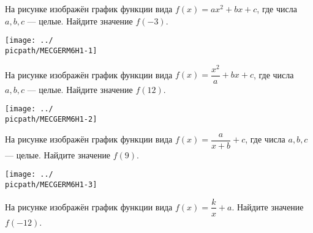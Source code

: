 %

\begin{class}[number=1]
	\begin{listofex}
		\item 
	\end{listofex}
\end{class}

\begin{homework}[number=1]
	\begin{listofex}
		\item 
		\begin{minipage}[t]{\bodywidth}
			На рисунке изображён график функции вида \( f(x)=ax^2+bx+c \), где числа \( a, b, c \) --- целые. Найдите значение \(f(-3)\).
		\end{minipage}
		\hspace{0.02\linewidth}
		\begin{minipage}[t]{\picwidth}
			\texttt{[image: ../\\picpath/MECGERM6H1-1]}
		\end{minipage}
		\item 
		\begin{minipage}[t]{\bodywidth}
			На рисунке изображён график функции вида \( f(x)=\dfrac{x^2}{a}+bx+c \), где числа \( a, b, c \) --- целые. Найдите значение \(f(12)\).
		\end{minipage}
		\hspace{0.02\linewidth}
		\begin{minipage}[t]{\picwidth}
			\texttt{[image: ../\\picpath/MECGERM6H1-2]}
		\end{minipage}
		\item
		\begin{minipage}[t]{\bodywidth}
			На рисунке изображён график функции вида \( f(x)=\dfrac{a}{x+b}+c \), где числа \( a, b, c \) --- целые. Найдите значение \(f(9)\).
		\end{minipage}
		\hspace{0.02\linewidth}
		\begin{minipage}[t]{\picwidth}
			\texttt{[image: ../\\picpath/MECGERM6H1-3]}
		\end{minipage}
		\item
		\begin{minipage}[t]{\bodywidth}
			На рисунке изображён график функции вида \( f(x)=\dfrac{k}{x}+a \). Найдите значение \(f(-12)\).

\end{minipage}
\end{listofex}
\end{homework}
